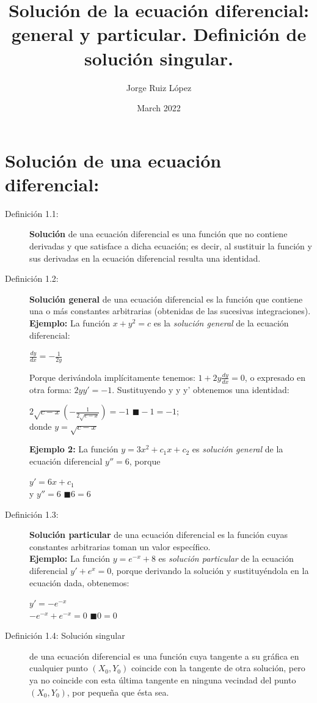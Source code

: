 \documentclass{article}
\title{ Solución de la ecuación diferencial: general y particular. Definición de solución singular.}
\author{Jorge Ruiz López}
\affil{Facultad de Ingeniería UNAM}
\date{March 2022}
\begin{document}
\maketitle
\section{Solución de una ecuación diferencial:}
\begin{description}
\item[Definición 1.1:]\textbf{Solución}\cite{carmona} de una ecuación diferencial es una función que no contiene derivadas y que satisface a dicha ecuación; es decir, al sustituir la función y sus derivadas en la ecuación diferencial resulta una identidad.
\item[Definición 1.2:]\textbf{Solución general} de una ecuación diferencial es la función
que contiene una o más constantes arbitrarias (obtenidas de las sucesivas integraciones).\\
\textbf{Ejemplo:} La función $x+y^2 = c$ es la \emph{solución general} de la ecuación diferencial:
\begin{center} $\frac{dy}{dx} = -\frac{1}{2y}$ \end{center}
Porque derivándola implícitamente tenemos: $1+2y\frac{dy}{dx} = 0$, o expresado en otra forma: $2yy' = -1$.
Sustituyendo y y y' obtenemos una identidad: 
\begin{center}${2\sqrt{c-x}} {(-\frac{1}{2\sqrt{c-x}})} = -1$ $\blacksquare  -1 = -1$;\\
donde $y=\sqrt{c-x}$\end{center}
\textbf{Ejemplo 2:} La función $y=3x^2+c_1x+c_2$ es \emph{solución general} de la ecuación diferencial $y''= 6$, porque \begin{center}$y'=6x +c_1$\\ y $y'' = 6$ $\blacksquare 6=6$\end{center}
\item[Definición 1.3:]\textbf{Solución particular} de una ecuación diferencial es la función cuyas constantes arbitrarias toman un valor específico.\\
\textbf{Ejemplo:} La función $y = e^{-x}+8$ es \emph{solución particular} de la ecuación diferencial 
$y'+e^x=0$, porque derivando la solución y sustituyéndola en la ecuación dada, obtenemos:
\begin{center}
$y'=-e^{-x}$\\$-e^{-x}+e^{-x}=0$ $\blacksquare 0 = 0$
\end{center}
\item[Definición 1.4: Solución singular] de una ecuación diferencial es una función cuya tangente a su gráfica en cualquier punto $(X_0, Y_0)$ coincide con la tangente de otra solución, pero ya no coincide con esta última tangente en ninguna vecindad del punto $(X_0, Y_0)$, por pequeña que ésta sea.\\\\

\end{description}
\end{document}
